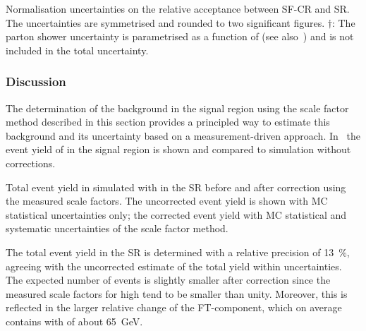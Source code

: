 \begin{table}[htbp]
  \centering

  \caption{Normalisation uncertainties on the relative acceptance
    between SF-CR and SR. The uncertainties are symmetrised and
    rounded to two significant figures. $\dagger$: The parton shower
    uncertainty is parametrised as a function of \tauhadvis \pT (see
    also~) and is not included in the
    total uncertainty.}%
  \label{tab:ttbarSF_acceptance_uncertainty}

  
\end{table}


\subsubsection{Discussion}

The determination of the \ttbarFakes background in the \hadhad signal
region using the scale factor method described in this section
provides a principled way to estimate this background and its
uncertainty based on a measurement-driven
approach. In~ the event yield of \ttbarFakes
in the \hadhad signal region is shown and compared to \ttbar
simulation without corrections.

\begin{table}[htbp]
  \centering

  \caption{Total event yield in simulated \ttbar with \faketauhadvis
    in the \hadhad SR before and after correction using the measured
    scale factors. The uncorrected event yield is shown with MC
    statistical uncertainties only; the corrected event yield with MC
    statistical and systematic uncertainties of the scale factor method.}%
  \label{tab:ttbarSF_yields}

  
\end{table}

The total \ttbarFakes event yield in the \hadhad SR is determined with
a relative precision of \SI{13}{\percent}, agreeing with the
uncorrected estimate of the total yield within uncertainties. The
expected number of \ttbarFakes events is slightly smaller after
correction since the measured scale factors for high \pT
\faketauhadvis tend to be smaller than unity. Moreover, this is
reflected in the larger relative change of the FT-component, which on
average contains \faketauhadvis with \pT of about \SI{65}{\GeV}.


